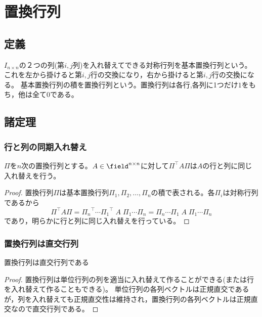 \chapter{置換行列}
    \section{定義}
        \begin{definition}
            \quad\par
            $I_{n\times n}$の２つの列(第$i,j$列)を入れ替えてできる対称行列を基本置換行列という。
            これを左から掛けると第$i,j$行の交換になり，右から掛けると第$i,j$行の交換になる。
            基本置換行列の積を置換行列という。置換行列は各行,各列に1つだけ$1$をもち，他は全て$0$である。
        \end{definition}
    \section{諸定理}
        \subsection{行と列の同期入れ替え}
            \begin{shadebox}
                $\Pi$を$n$次の置換行列とする。$A\in\field^{n\times n}$に対して$\Pi^\top A\Pi$は$A$の行と列に同じ入れ替えを行う。
            \end{shadebox}
            \begin{proof}
                置換行列$\Pi$は基本置換行列$\Pi_1,\Pi_2,\dotsc,\Pi_n$の積で表される。各$\Pi_i$は対称行列であるから
                \[\Pi^\top A\Pi = {\Pi_n}^\top\dotsm{\Pi_1}^\top\;A\;\Pi_1\dotsm\Pi_n = \Pi_n\dotsm\Pi_1\;A\;\Pi_1\dotsm\Pi_n\]
                であり，明らかに行と列に同じ入れ替えを行っている。
            \end{proof}
        \subsection{置換行列は直交行列}
            \begin{shadebox}
                置換行列は直交行列である
            \end{shadebox}
            \begin{proof}
                置換行列は単位行列の列を適当に入れ替えて作ることができる(または行を入れ替えて作ることもできる)。
                単位行列の各列ベクトルは正規直交であるが，列を入れ替えても正規直交性は維持され，置換行列の各列ベクトルは正規直交なので直交行列である。
            \end{proof}